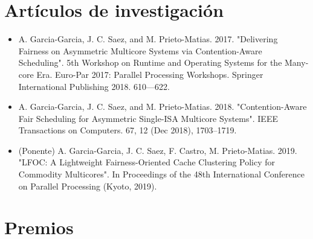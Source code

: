 \documentclass[10pt,a4paper,sans]{moderncv}        %
\begin{document}
\section{Artículos de investigación}
\begin{itemize}
\item A. Garcia-Garcia, J. C. Saez, and M. Prieto-Matias. 2017. "Delivering Fairness on Asymmetric Multicore Systems via Contention-Aware Scheduling". 5th Workshop on Runtime and Operating Systems for the Many-core Era. Euro-Par 2017: Parallel Processing Workshops. Springer International Publishing 2018. 610—622.
\smallskip
\item A. Garcia-Garcia, J. C. Saez, and M. Prieto-Matias. 2018. "Contention-Aware Fair Scheduling for Asymmetric Single-ISA Multicore Systems". IEEE Transactions on Computers. 67, 12 (Dec 2018), 1703–1719.
\smallskip
\item (Ponente) A. Garcia-Garcia, J. C. Saez, F. Castro, M. Prieto-Matias. 2019. "LFOC: A Lightweight Fairness-Oriented Cache Clustering Policy for Commodity Multicores". In Proceedings of the 48th International Conference on Parallel Processing (Kyoto, 2019).
\end{itemize}

\section{Premios}
\end{document}
